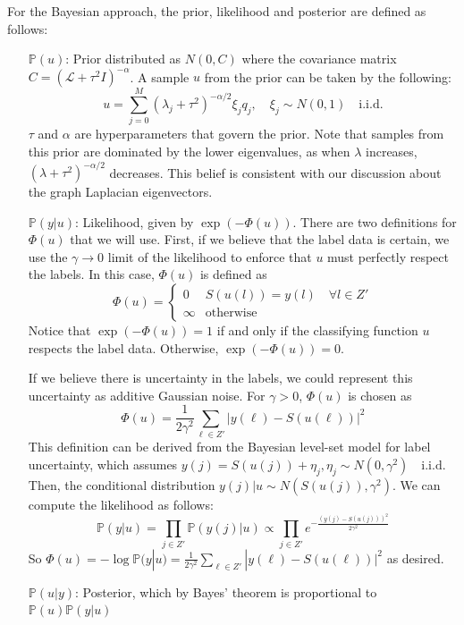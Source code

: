 \documentclass{siamart1116}
\begin{document}
For the Bayesian approach, the prior, likelihood and posterior are defined as follows:
\begin{itemize}
\item[$\mathbb{P}(u)$:] Prior distributed as $N(0,C)$ where the covariance matrix $C = (\mathcal{L} + \tau^2I)^{-\alpha}$. A sample $u$ from the prior can be taken by the following:
\begin{equation}
\label{eqn:prior}
u = \sum_{j=0}^M (\lambda_j + \tau^2)^{-\alpha/2}\xi_j q_j,\quad \xi_j\sim N(0,1) \quad \text{i.i.d.}
\end{equation}
$\tau$ and $\alpha$ are hyperparameters that govern the prior. Note that samples from this prior are dominated by the lower eigenvalues, as when $\lambda$ increases, $(\lambda + \tau^2)^{-\alpha/2}$ decreases. This belief is consistent with our discussion about the graph Laplacian eigenvectors.

\item[$\mathbb{P}(y|u)$:] Likelihood, given by $\exp(-\Phi(u))$. There are two definitions for $\Phi(u)$ that we will use.
First, if we believe that the label data is certain, we use the $\gamma\to 0$ limit of the likelihood to enforce that $u$ must perfectly respect the labels. In this case, $\Phi(u)$ is defined as
\begin{equation}
\label{eqn:gammatozero}
\Phi(u) = \begin{cases}
0 & S(u(l)) = y(l) \quad \forall l \in Z'\\
\infty & \text{otherwise}
\end{cases}
\end{equation}
Notice that $\exp(-\Phi(u)) = 1$ if and only if the classifying function $u$ respects the label data. Otherwise, $\exp(-\Phi(u)) = 0$.

If we believe there is uncertainty in the labels, we could represent this uncertainty as additive Gaussian noise. For $\gamma > 0$, $\Phi(u)$ is chosen as
\begin{equation}
\label{eqn:likelihood}
\Phi(u) = \displaystyle \frac{1}{2\gamma^2}\sum_{\ell\in Z'}|y(\ell)-S(u(\ell))|^2
\end{equation}
This definition can be derived from the Bayesian level-set model for label uncertainty, which assumes $y(j) = S(u(j)) + \eta_j, \eta_j \sim N(0,\gamma^2) \quad \text{i.i.d.}$ Then, the conditional distribution $y(j) | u \sim N(S(u(j)),\gamma^2)$. We can compute the likelihood as follows:
\[ \mathbb{P}(y|u) = \prod_{j\in Z'} \mathbb{P}(y(j)|u) \propto \prod_{j\in Z'} e^{-\frac{(y(j)-S(u(j)))^2} {2\gamma^2}}\]
So $\Phi(u) = -\log \mathbb{P}(y|u) = \frac{1}{2\gamma^2}\sum_{\ell\in Z'}|y(\ell)-S(u(\ell))|^2$ as desired.

\item[$\mathbb{P}(u|y)$:] Posterior, which by Bayes' theorem is proportional to $\mathbb{P}(u) \mathbb{P}(y | u)$
\end{itemize}
\end{document}
